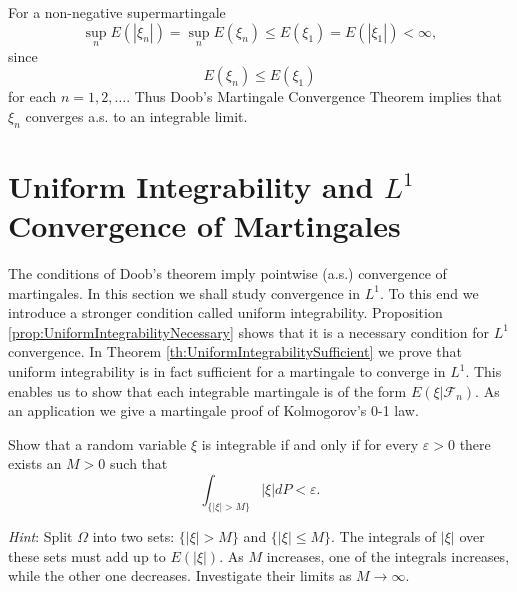 \begin{Solution}
\label{sol:Exercise42}
For a non-negative supermartingale
\[
\sup_{n} E \left(| \xi_{n} |\right) = \sup_{n} E \left(\xi_{n}\right) \leq E \left(\xi_{1}\right) = E \left(| \xi_{1} |\right) < \infty ,
\]
since
\[
E \left(\xi_{n}\right) \leq E \left(\xi_{1}\right)
\]
for each $n = 1,2,\ldots$. Thus Doob's Martingale Convergence Theorem implies that $\xi_{n}$ converges a.s. to an integrable limit.
\end{Solution}

\section{Uniform Integrability and $L^1$ Convergence of Martingales}
\label{sec:UniformIntegrabilityAndL1Convergence}

The conditions of Doob's theorem imply pointwise (a.s.) convergence of martingales. In this section we shall study convergence in $L^1$. To this end we introduce a stronger condition called uniform integrability. Proposition \ref{prop:UniformIntegrabilityNecessary} shows that it is a necessary condition for $L^1$ convergence. In Theorem \ref{th:UniformIntegrabilitySufficient} we prove that uniform integrability is in fact sufficient for a martingale to converge in $L^1$. This enables us to show that each integrable martingale is of the form $E(\xi | \mathcal{F}_n)$. As an application we give a martingale proof of Kolmogorov's 0-1 law.

\begin{Exercise}
\label{ex:IntegrableCharacterization}
Show that a random variable $\xi$ is integrable if and only if for every $\varepsilon > 0$ there exists an $M > 0$ such that
\[
\int_{\{| \xi | > M \}} | \xi | d P < \varepsilon .
\]

\textit{Hint}: Split $\Omega$ into two sets: $\{|\xi| > M\}$ and $\{|\xi| \leq M\}$. The integrals of $|\xi|$ over these sets must add up to $E(|\xi|)$. As $M$ increases, one of the integrals increases, while the other one decreases. Investigate their limits as $M \to \infty$.
\end{Exercise}


